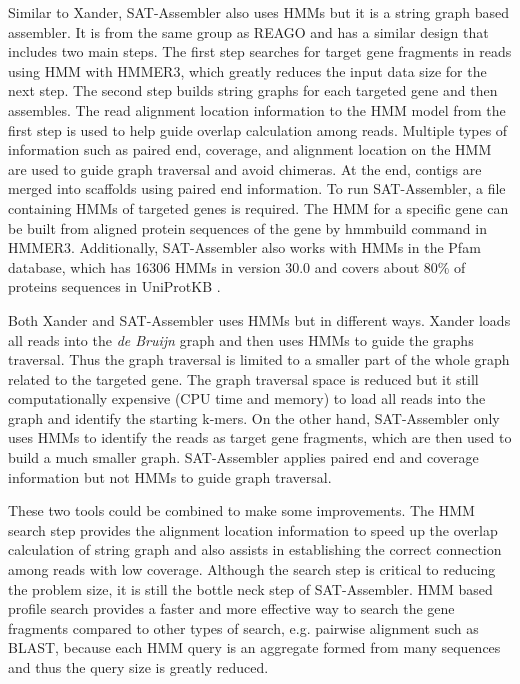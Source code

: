 \documentclass[]{msu-thesis}
\begin{document}
Similar to Xander, SAT-Assembler also uses HMMs but it is a string graph
based assembler. It is from the same group as REAGO and has a similar
design that includes two main steps. The first step searches for
target gene fragments in reads using HMM with HMMER3, which greatly
reduces the input data size for the next step. The second step builds
string graphs for each targeted gene and then assembles. The read
alignment location information to the HMM model from the first step is
used to help guide overlap calculation among reads. Multiple types of
information such as paired end, coverage, and alignment location on
the HMM are used to guide graph traversal and avoid chimeras. At the end,
contigs are merged into scaffolds using paired end information.  To
run SAT-Assembler, a file containing HMMs of targeted genes is
required. The HMM for a specific gene can be built from aligned
protein sequences of the gene by hmmbuild command in
HMMER3. Additionally, SAT-Assembler also works with HMMs in the Pfam
database, which has 16306 HMMs in version 30.0 and covers about 80\%
of proteins sequences in UniProtKB 
\cite{finn_pfam_2016}.

Both Xander and SAT-Assembler uses HMMs but in different ways. Xander
loads all reads into the \textit{de Bruijn} graph and then uses HMMs
to guide the graphs traversal. Thus the graph traversal is limited to
a smaller part of the whole graph related to the targeted gene. The graph
traversal space is reduced but it still computationally expensive (CPU
time and memory) to load all reads into the graph and identify the
starting k-mers.  On the other hand, SAT-Assembler
only uses HMMs to identify the reads as target gene fragments, which
are then used to build a much smaller graph.
SAT-Assembler applies paired end and coverage
information but not HMMs to guide graph traversal.

These two tools could be combined to make some improvements.
The HMM search step
provides the alignment location information to speed up the
overlap calculation of string graph and also assists in establishing the
correct connection among reads with low coverage.
Although the search step is critical to reducing
the problem size, it is still the bottle neck step of
SAT-Assembler. HMM based profile search provides a faster and more
effective way to search the gene fragments compared to other types
of search, e.g. pairwise alignment such as BLAST, because each HMM query
is an aggregate formed from many sequences and thus the query size
is greatly reduced.
\end{document}

